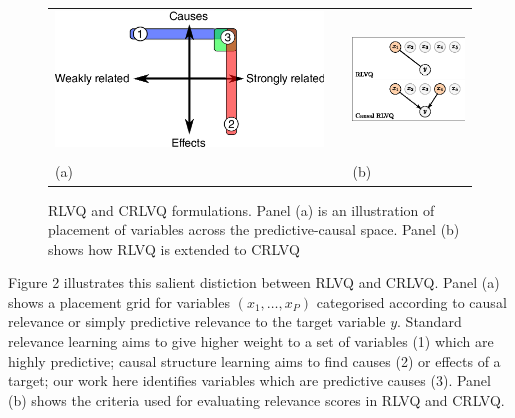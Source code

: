 \documentclass{esannV2}
\begin{document}
\begin{figure}
\begin{tabular}{m{}cm{}}
\includegraphics[width=.5\textwidth]{causal-relevance-dimensions.eps} & &
\includegraphics[width=.4\textwidth]{rlvq-crlvq.eps} \\
& \\
(a) & & (b)  
\end{tabular}
\label{fig:causes}
\caption{RLVQ and CRLVQ formulations. Panel (a) is an illustration of placement of variables across the predictive-causal space. Panel (b) shows how RLVQ is extended to CRLVQ}
\end{figure}

Figure 2 illustrates this salient distiction between RLVQ and CRLVQ. Panel (a) shows a placement grid for variables $(x_1, \ldots, x_P)$ categorised according to causal relevance or simply predictive relevance to the target variable $y$. Standard relevance learning aims to give higher weight to a set of variables (1) which are highly predictive; causal structure learning aims to find causes (2) or effects of a target; our work here identifies variables which are predictive causes (3). Panel (b) shows the criteria used for evaluating relevance scores in RLVQ and CRLVQ.
\end{document}

